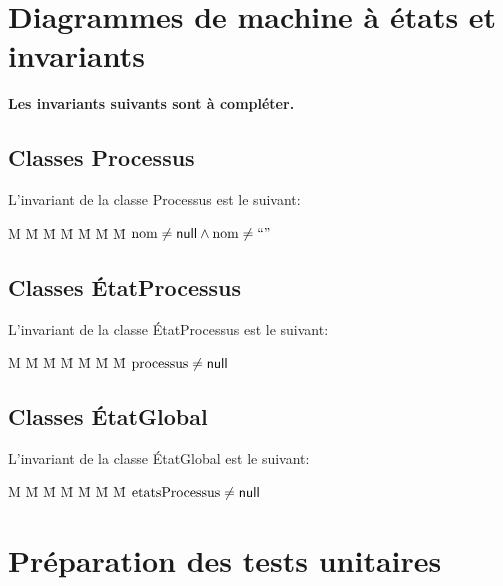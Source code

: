 \documentclass[11pt,article]{article}
\newcommand{\nullvalue}{\textsf{null}\xspace}
\begin{document}
\newpage

\section{Diagrammes de machine à états et invariants}

{\color{red}\textbf{Les invariants suivants sont à compléter.}}

\subsection{Classes \textsf{Processus}}

L'invariant de la classe \textsf{Processus} est le suivant:
\newcommand{\nom}{\ensuremath\mathrm{nom}}
\newcommand{\vvide}{\ensuremath\mathrm{``"}}
\begin{tabbing}
M \= M \= M \= M \= M \= M \= M \kill
\> $\nom \neq \nullvalue \land \nom \neq \vvide$\\
\end{tabbing}

\subsection{Classes \textsf{ÉtatProcessus}}

\newcommand{\processus}{\ensuremath\mathrm{processus}}
L'invariant de la classe \textsf{ÉtatProcessus} est le suivant:
\begin{tabbing}
M \= M \= M \= M \= M \= M \= M \kill
\> $\processus \neq \nullvalue$\\
\end{tabbing}

\subsection{Classes \textsf{ÉtatGlobal}}

\newcommand{\etatsprocessus}{\ensuremath\mathrm{etatsProcessus}}
L'invariant de la classe \textsf{ÉtatGlobal} est le suivant:
\begin{tabbing}
M \= M \= M \= M \= M \= M \= M \kill
\> $\etatsprocessus \neq \nullvalue$\\
\end{tabbing}

\newpage

\section{Préparation des tests unitaires}
\end{document}
